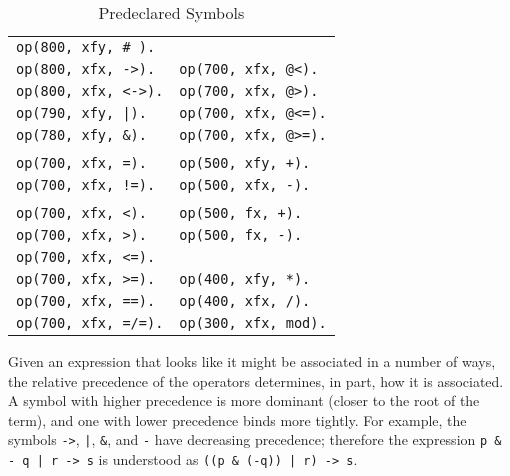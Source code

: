 \documentclass[11pt]{article}
\begin{document}
\begin{table}[htbp] \centering \small
\caption{Predeclared Symbols}  \label{predeclared-ops}
\begin{tabular}{ll}
\hline
\verb:op(800, xfy, # ).:                                  \\
\verb:op(800, xfx, ->).:   &    \verb:op(700, xfx, @<).:   \\
\verb:op(800, xfx, <->).:  &    \verb:op(700, xfx, @>).:   \\
\verb:op(790, xfy, |).:    &    \verb:op(700, xfx, @<=).:  \\
\verb:op(780, xfy, &).:    &    \verb:op(700, xfx, @>=).:  \\
                                                           \\
\verb:op(700, xfx, =).:    &    \verb:op(500, xfy, +).:    \\
\verb:op(700, xfx, !=).:   &    \verb:op(500, xfx, -).:    \\
                                                           \\
\verb:op(700, xfx, <).:    &    \verb:op(500, fx, +).:     \\
\verb:op(700, xfx, >).:    &    \verb:op(500, fx, -).:     \\
\verb:op(700, xfx, <=).:                                   \\
\verb:op(700, xfx, >=).:   &    \verb:op(400, xfy, *).:    \\
\verb:op(700, xfx, ==).:   &    \verb:op(400, xfx, /).:    \\
\verb:op(700, xfx, =/=).:  &    \verb:op(300, xfx, mod).:  \\
\hline
\end{tabular}
\end{table}

Given an expression that looks like it might be
associated in a number of ways, the relative precedence of the
operators determines, in part, how it is associated.  A symbol with higher
precedence is more dominant (closer to the root of the term), and
one with lower precedence binds more tightly.  For example, the
symbols
\verb:->:,
\verb:|:,
\verb:&:, and
\verb:-: have decreasing precedence; therefore the expression
\verb:p & - q | r -> s: is understood as \verb:((p & (-q)) | r) -> s:.
\end{document}
